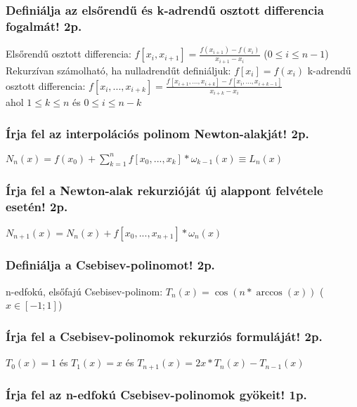 \documentclass[12pt,a4paper]{article}
\begin{document}
\pagebreak

\subsubsection{Definiálja az elsőrendű és k-adrendű osztott differencia fogalmát! 2p.}

\begin{outline}
	\1 Elsőrendű osztott differencia: $f[x_i,x_{i+1}] = \frac{f(x_{i+1})-f(x_i)}{x_{i+1} - x_i}$
	\;\; ($0 \le i \le n-1$)
		\2 Rekurzívan számolható, ha nulladrendűt definiáljuk: $f[x_i] = f(x_i)$
	\1 k-adrendű osztott differencia:
	$f[x_i,...,x_{i+k}] = \frac{f[x_{i+1},...,x_{i+k}] - f[x_i,...,x_{i+k-1}]}{x_{i+k} - x_i}$\\
	ahol $1 \le k \le n$ és $0 \le i \le n-k$
\end{outline}

\subsubsection{Írja fel az interpolációs polinom Newton-alakját! 2p.}

$N_n(x) = f(x_0) + \sum_{k=1}^n f[x_0,...,x_k] * \omega_{k-1}(x) \equiv L_n(x)$

\subsubsection{Írja fel a Newton-alak rekurzióját új alappont felvétele esetén! 2p.}

$N_{n+1}(x) = N_n(x) + f[x_0,...,x_{n+1}] * \omega_{n}(x)$

\subsubsection{Definiálja a Csebisev-polinomot! 2p.}

n-edfokú, elsőfajú Csebisev-polinom: $T_n(x) = \cos(n*\arccos(x))$ ($x \in [-1;1]$)

\subsubsection{Írja fel a Csebisev-polinomok rekurziós formuláját! 2p.}

$T_0(x) = 1$ \;\;és\;\; $T_1(x) = x$ \;\;és\;\; $T_{n+1}(x) = 2x*T_n(x) - T_{n-1}(x)$

\subsubsection{Írja fel az n-edfokú Csebisev-polinomok gyökeit! 1p.}
\end{document}
